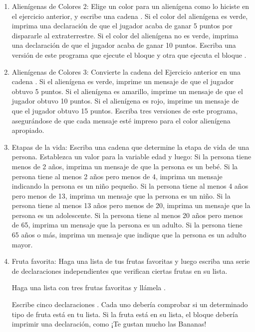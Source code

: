 \begin{enumerate}[6.5.1]
	\item Alienígenas de Colores 2: Elige un color para un alienígena como lo hiciste en el ejercicio anterior,
	y escribe una cadena {}.	
	Si el color del alienígena es verde, imprima una declaración de que el jugador acaba de ganar 5
	puntos por dispararle al extraterrestre.	
	Si el color del alienígena no es verde, imprima una declaración de que el jugador acaba de ganar
	10 puntos.	
	Escriba una versión de este programa que ejecute el bloque {} y otra que
	ejecuta el bloque {}.
	
	
	\item  Alienígenas de Colores 3: Convierte la cadena {} del Ejercicio anterior en una cadena  {}.	
	Si el alienígena es verde, imprime un mensaje de que el jugador obtuvo 5 puntos.	
	Si el alienígena es amarillo, imprime un mensaje de que el jugador obtuvo 10 puntos.	
	Si el alienígena es rojo, imprime un mensaje de que el jugador obtuvo 15 puntos.	
	Escriba tres versiones de este programa, asegurándose de que cada mensaje esté impreso para el color alienígena apropiado.
	
	\item Etapas de la vida: Escriba una cadena {} que determine la etapa de vida de una persona.
	Establezca un valor para la variable edad y luego:	
	Si la persona tiene menos de 2 años, imprima un mensaje de que la persona es un bebé.	
	Si la persona tiene al menos 2 años pero menos de 4, imprima un mensaje indicando la persona es un niño pequeño.	
	Si la persona tiene al menos 4 años pero menos de 13, imprima un mensaje que la persona es un niño.	
	Si la persona tiene al menos 13 años pero menos de 20, imprima un mensaje que la persona es un adolescente.	
	Si la persona tiene al menos 20 años pero menos de 65, imprima un mensaje que la persona es un adulto.	
	Si la persona tiene 65 años o más, imprima un mensaje que indique que la persona es un adulto mayor.	
	
	\item  Fruta favorita: Haga una lista de tus frutas favoritas y luego escriba una serie de
	declaraciones {} independientes que verifican ciertas frutas en su lista.
	
	Haga una lista con tres frutas favoritas y llámela {}.
	
	Escribe cinco declaraciones {}. 
	Cada uno debería comprobar si un determinado tipo de fruta 	está en tu lista. 
	Si la fruta está en su lista, el bloque {} debería imprimir una declaración,
	como ¡Te gustan mucho las Bananas!
	

\end{enumerate}
